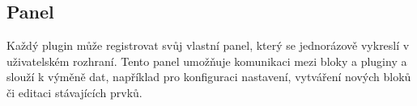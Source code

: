 \subsection{Panel}

Každý plugin může registrovat svůj vlastní panel, který se jednorázově vykreslí v uživatelském rozhraní. 
Tento panel umožňuje komunikaci mezi bloky a pluginy a slouží k výměně dat, například pro konfiguraci nastavení, vytváření nových bloků či editaci stávajících prvků.










